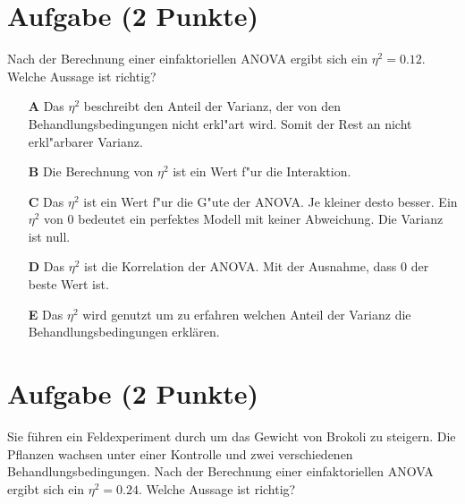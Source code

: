 \documentclass[a4paper, 9pt]{scrartcl}\usepackage[]{graphicx}\usepackage[]{xcolor}
\begin{document}
\section{Aufgabe \hfill (2 Punkte)}





Nach der Berechnung einer einfaktoriellen ANOVA ergibt sich ein $\eta^2 = 0.12$. Welche Aussage ist richtig?



\begin{enumerate}
\item [\textbf{A} \msquare] Das $\eta^2$ beschreibt den Anteil der Varianz, der von den Behandlungsbedingungen nicht erkl{"a}rt wird. Somit der Rest an nicht erkl{"a}rbarer Varianz.
\item [\textbf{B} \msquare] Die Berechnung von $\eta^2$ ist ein Wert f{"u}r die Interaktion.
\item [\textbf{C} \msquare] Das $\eta^2$ ist ein Wert f{"u}r die G{"u}te der ANOVA. Je kleiner desto besser. Ein $\eta^2$ von 0 bedeutet ein perfektes Modell mit keiner Abweichung. Die Varianz ist null.
\item [\textbf{D} \msquare] Das $\eta^2$ ist die Korrelation der ANOVA. Mit der Ausnahme, dass 0 der beste Wert ist.
\item [\textbf{E} \msquare] Das $\eta^2$ wird genutzt um zu erfahren welchen Anteil der Varianz die Behandlungsbedingungen erklären.
\end{enumerate} 

\section{Aufgabe \hfill (2 Punkte)}



Sie führen ein Feldexperiment durch um das Gewicht von Brokoli zu
steigern. Die Pflanzen wachsen unter einer Kontrolle und zwei verschiedenen
Behandlungsbedingungen. Nach der Berechnung einer einfaktoriellen ANOVA
ergibt sich ein $\eta^2 = 0.24$. Welche Aussage ist richtig?
\end{document}
